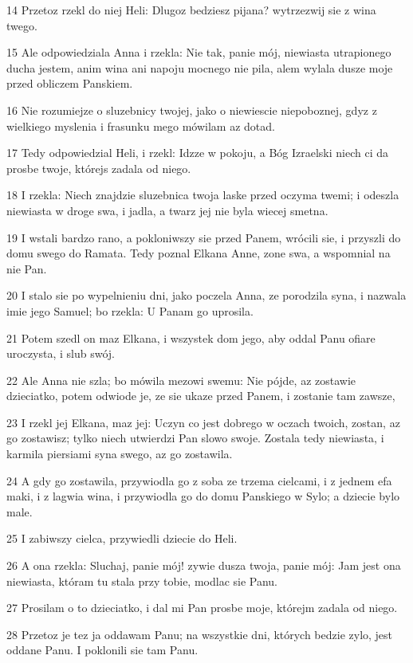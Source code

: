 \par 14 Przetoz rzekl do niej Heli: Dlugoz bedziesz pijana? wytrzezwij sie z wina twego.
\par 15 Ale odpowiedziala Anna i rzekla: Nie tak, panie mój, niewiasta utrapionego ducha jestem, anim wina ani napoju mocnego nie pila, alem wylala dusze moje przed obliczem Panskiem.
\par 16 Nie rozumiejze o sluzebnicy twojej, jako o niewiescie niepoboznej, gdyz z wielkiego myslenia i frasunku mego mówilam az dotad.
\par 17 Tedy odpowiedzial Heli, i rzekl: Idzze w pokoju, a Bóg Izraelski niech ci da prosbe twoje, którejs zadala od niego.
\par 18 I rzekla: Niech znajdzie sluzebnica twoja laske przed oczyma twemi; i odeszla niewiasta w droge swa, i jadla, a twarz jej nie byla wiecej smetna.
\par 19 I wstali bardzo rano, a pokloniwszy sie przed Panem, wrócili sie, i przyszli do domu swego do Ramata. Tedy poznal Elkana Anne, zone swa, a wspomnial na nie Pan.
\par 20 I stalo sie po wypelnieniu dni, jako poczela Anna, ze porodzila syna, i nazwala imie jego Samuel; bo rzekla: U Panam go uprosila.
\par 21 Potem szedl on maz Elkana, i wszystek dom jego, aby oddal Panu ofiare uroczysta, i slub swój.
\par 22 Ale Anna nie szla; bo mówila mezowi swemu: Nie pójde, az zostawie dzieciatko, potem odwiode je, ze sie ukaze przed Panem, i zostanie tam zawsze,
\par 23 I rzekl jej Elkana, maz jej: Uczyn co jest dobrego w oczach twoich, zostan, az go zostawisz; tylko niech utwierdzi Pan slowo swoje. Zostala tedy niewiasta, i karmila piersiami syna swego, az go zostawila.
\par 24 A gdy go zostawila, przywiodla go z soba ze trzema cielcami, i z jednem efa maki, i z lagwia wina, i przywiodla go do domu Panskiego w Sylo; a dziecie bylo male.
\par 25 I zabiwszy cielca, przywiedli dziecie do Heli.
\par 26 A ona rzekla: Sluchaj, panie mój! zywie dusza twoja, panie mój: Jam jest ona niewiasta, któram tu stala przy tobie, modlac sie Panu.
\par 27 Prosilam o to dzieciatko, i dal mi Pan prosbe moje, którejm zadala od niego.
\par 28 Przetoz je tez ja oddawam Panu; na wszystkie dni, których bedzie zylo, jest oddane Panu. I poklonili sie tam Panu.

